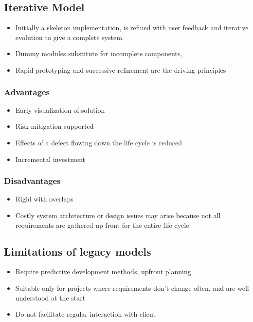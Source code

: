 \documentclass{article}
\begin{document}
\subsection{Iterative Model}
\begin{itemize}
    \item Initially a skeleton implementation, is refined with user feedback and iterative evolution to give a complete system. 
    
    \item Dummy modules substitute for incomplete components,
    
    \item Rapid prototyping and successive refinement are the driving principles
\end{itemize}

\subsubsection{Advantages}
\begin{itemize}
    \item Early visualization of solution
    
    \item Risk mitigation supported
    
    \item Effects of a defect flowing down the life cycle is reduced
    
    \item Incremental investment
\end{itemize}

\subsubsection{Disadvantages}
\begin{itemize}
    \item Rigid with overlaps 
    
    \item Costly system architecture or design issues may arise because not all requirements are gathered up front for the entire life cycle
\end{itemize}

\subsection{Limitations of legacy models}
\begin{itemize}
    \item Require predictive development methods, upfront planning
    
    \item Suitable only for projects where requirements don't change often, and are well understood at the start
    
    \item Do not facilitate regular interaction with client 
\end{itemize}
\end{document}
